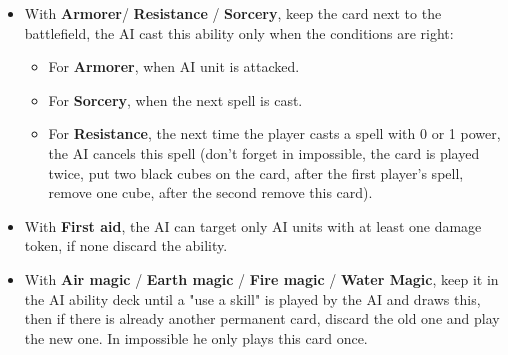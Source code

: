 \begin{multicols}{2}
\begin{itemize}
    \item With \textbf{Armorer}/ \textbf{Resistance} / \textbf{Sorcery}, keep the card next to the battlefield, the AI cast this ability only when the conditions are right:
    \begin{itemize}
        \item For \textbf{Armorer}, when AI unit is attacked.
        \item For \textbf{Sorcery}, when the next spell is cast.
        \item For \textbf{Resistance}, the next time the player casts a spell with 0 or 1 power, the AI cancels this spell (don’t forget in impossible, the card is played twice, put two black cubes on the card, after the first player's spell, remove one cube, after the second remove this card).
    \end{itemize}
    \item With \textbf{First aid}, the AI can target only AI units with at least one damage token, if none discard the ability. 
    \item With \textbf{Air magic} / \textbf{Earth magic} / \textbf{Fire magic} / \textbf{Water Magic}, keep it in the AI ability deck until a "use a skill" is played by the AI and draws this, then if there is already another permanent card, discard the old one and play the new one. In impossible he only  plays this card once.
\end{itemize}
\end{multicols}


\newpage

